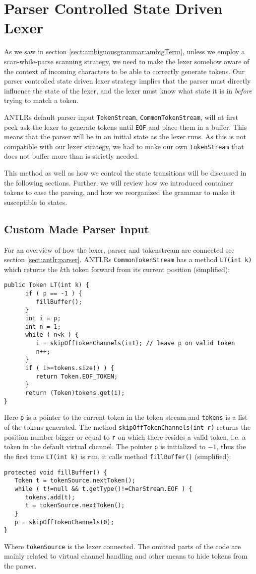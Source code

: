 \section{Parser Controlled State Driven Lexer}
\label{sect:impl:parser_controlled_state_driven_lexer}
As we saw in section \ref{sect:ambiguousgrammar:ambigTerm}, unless we employ a scan-while-parse scanning strategy, we need to make the lexer somehow aware of the context of incoming characters to be able to correctly generate tokens. Our parser controlled state driven lexer strategy implies that the parser must directly influence the state of the lexer, and the lexer must know what state it is in \emph{before} trying to match a token. 

ANTLRs default parser input \verb!TokenStream!, \verb!CommonTokenStream!, will at first peek ask the lexer to generate tokens until \verb!EOF! and place them in a buffer. This means that the parser will be in an initial state as the lexer runs. As this is not compatible with our lexer strategy, we had to make our own \verb!TokenStream! that does not buffer more than is strictly needed. 

This method as well as how we control the state transitions will be discussed in the following sections. Further, we will review how we introduced container tokens to ease the parsing, and how we reorganized the grammar to make it susceptible to states.

\subsection{Custom Made Parser Input}
For an overview of how the lexer, parser and tokenstream are connected see section \ref{sect:antlr:parser}. ANTLRs \verb!CommonTokenStream! has a method \verb!LT(int k)! which returns the $k$th token forward from its current position (simplified):
\begin{Verbatim}
public Token LT(int k) {
      if ( p == -1 ) {
         fillBuffer();
      }
      int i = p;
      int n = 1;
      while ( n<k ) {
         i = skipOffTokenChannels(i+1); // leave p on valid token
         n++;
      }
      if ( i>=tokens.size() ) {
         return Token.EOF_TOKEN;
      }
      return (Token)tokens.get(i);
}
\end{Verbatim}
Here \verb!p! is a pointer to the current token in the token stream and \verb!tokens! is a list of the tokens generated. The method \verb!skipOffTokenChannels(int r)! returns the position number bigger or equal to \verb!r! on which there resides a valid token, i.e. a token in the default virtual channel. The pointer \verb!p! is initialized to $-1$, thus the the first time \verb!LT(int k)! is run, it calls method \verb!fillBuffer()! (simplified):
\begin{Verbatim}
protected void fillBuffer() {
   Token t = tokenSource.nextToken();
   while ( t!=null && t.getType()!=CharStream.EOF ) {
      tokens.add(t);
      t = tokenSource.nextToken();
   }
   p = skipOffTokenChannels(0);
}
\end{Verbatim}
Where \verb!tokenSource! is the lexer connected. The omitted parts of the code are mainly related to virtual channel handling and other means to hide tokens from the parser. 

